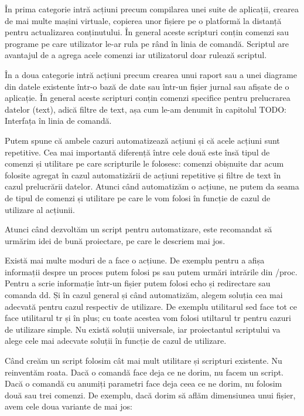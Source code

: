 În prima categorie intră acțiuni precum compilarea unei suite de aplicații,
crearea de mai multe mașini virtuale, copierea unor fișiere pe o platformă la
distanță pentru actualizarea conținutului. În general aceste scripturi conțin
comenzi sau programe pe care utilizator le-ar rula pe rând în linia de comandă.
Scriptul are avantajul de a agrega acele comenzi iar utilizatorul doar rulează
scriptul.

În a doua categorie intră acțiuni precum crearea unui raport sau a unei diagrame
din datele existente într-o bază de date sau într-un fișier jurnal sau afișate
de o aplicație. În general aceste scripturi conțin comenzi specifice pentru
prelucrarea datelor (text), adică filtre de text, așa cum le-am denumit în
capitolul TODO: Interfața în linia de comandă.

Putem spune că ambele cazuri automatizează acțiuni și că acele acțiuni sunt
repetitive. Cea mai importantă diferență între cele două este însă tipul de
comenzi și utilitare pe care scripturile le folosesc: comenzi obișnuite dar acum
folosite agregat în cazul automatizării de acțiuni repetitive și filtre de text
în cazul prelucrării datelor. Atunci când automatizăm o acțiune, ne putem da
seama de tipul de comenzi și utilitare pe care le vom folosi în funcție de cazul
de utilizare al acțiunii.

Atunci când dezvoltăm un script pentru automatizare, este recomandat să urmărim
idei de bună proiectare, pe care le descriem mai jos.

Există mai multe moduri de a face o acțiune. De exemplu pentru a afișa
informații despre un proces putem folosi ps sau putem urmări intrările din
/proc. Pentru a scrie informație într-un fișier putem folosi echo și redirectare
sau comanda dd. Și în cazul general și când automatizăm, alegem soluția cea mai
adecvată pentru cazul respectiv de utilizare. De exemplu utilitarul sed face tot
ce face utilitarul tr și în plus; cu toate acestea vom folosi utiltarul tr
pentru cazuri de utilizare simple. Nu există soluții universale, iar
proiectantul scriptului va alege cele mai adecvate soluții în funcție de cazul
de utilizare.

Când creăm un script folosim cât mai mult utilitare și scripturi existente. Nu
reinventăm roata. Dacă o comandă face deja ce ne dorim, nu facem un script. Dacă
o comandă cu anumiți parametri face deja ceea ce ne dorim, nu folosim două sau
trei comenzi. De exemplu, dacă dorim să aflăm dimensiunea unui fișier, avem cele
doua variante de mai jos:

